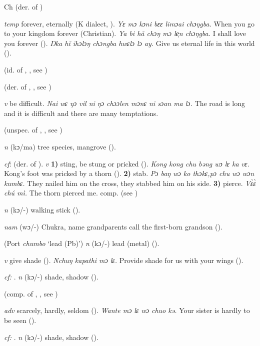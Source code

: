 \begin{letter}{Ch}
 (der. of ) 

 \textit{temp} forever, eternally (K dialect, \citealt{Pichl1967}). \textit{Yɛ mɔ kɔni bɛɛ limɔai chɔŋgba.} When you go to your kingdom forever (Christian). \textit{Ya bi hã chɔŋ mɔ le̹n chɔŋgba.} I shall love you forever (\citealt{Pichl1967}). \textit{Ŋka hĩ ihɔlɔŋ chɔngba hwɛlɔ lɔ ay.} Give us eternal life in this world (\citealt{Pichl1967}). 

 (id. of , , see ) 

 (der. of , , see ) 

 \textit{v} be difficult. \textit{Nai wɛ ŋɔ vil ni ŋɔ chɔɔlen mɔnɛ ni sɔan ma lɔ.} The road is long and it is difficult and there are many temptations.

 (unspec. of , , see ) 

 \textit{n} (kɔ/ma) tree species, mangrove (\citealt{Pichl1967}). 

 \textit{cf}:  (der. of ). \textit{v} \textbf{1)} sting, be stung or pricked (\citealt{Pichl1967}). \textit{Kong kong chu bəng wɔ lɛ ka vɛ.} Kong's foot was pricked by a thorn (\citealt{Pichl1967}). \textbf{2)} stab. \textit{Pɔ baŋ wɔ ko thɔkɛ,pɔ chu wɔ wɔn kumbɛ.} They nailed him on the cross, they stabbed him on his side. \textbf{3)} pierce. \textit{Vɛ̀ɛ̀ chú mì.} The thorn pierced me. comp.  (see ) 

 \textit{n} (kɔ/-) walking stick (\citealt{Pichl1967}). 

 \textit{nam} (wɔ/-) Chukra, name grandparents call the first-born grandson (\citealt{Pichl1967}). 

 (Port \textit{chumbo} ‘lead (Pb)') \textit{n} (kɔ/\nobreakdash-) lead (metal) (\citealt{Pichl1967}).

 \textit{v} give shade (\citealt{Pichl1967}). \textit{Nchuŋ kapathi mɔ lɛ.} Provide shade for us with your wings (\citealt{Pichl1967}). 

 \textit{cf:} . \textit{n} (kɔ/-) shade, shadow (\citealt{Pichl1967}).

 (comp. of , , see ) 

 \textit{adv} scarcely, hardly, seldom (\citealt{Pichl1967}). \textit{Wante mɔ lɛ wɔ chuo kə.} Your sister is hardly to be seen (\citealt{Pichl1967}). 

 \textit{cf:} . \textit{n} (kɔ/-) shade, shadow (\citealt{Pichl1967}).

\end{letter}
